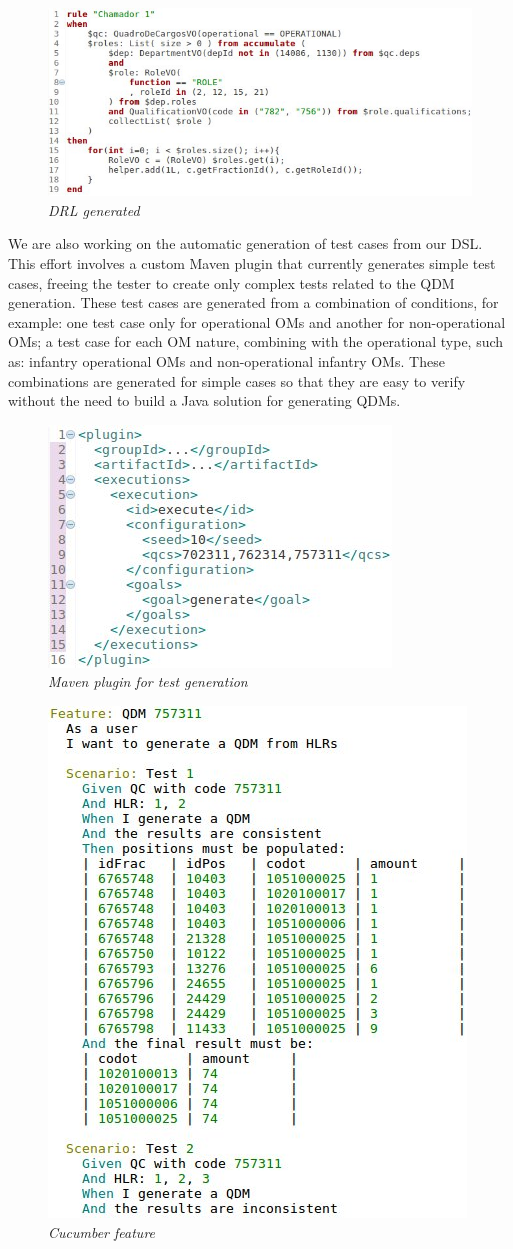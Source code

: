 \begin{figure}[!ht] \centering
	\includegraphics[width=.47\textwidth]{img/artigo_drl.jpg}
	\caption{\it DRL generated} 
	\label{fig:drl}
\end{figure}


We are also working on the automatic generation of test cases 
from our DSL. This effort involves a custom Maven plugin that currently generates simple test cases, 
freeing the tester to create only complex tests related to the QDM generation. 
These test cases are generated from a combination of conditions, for example: one test case only for operational OMs 
and another for non-operational OMs; a test case for each OM nature, combining with the operational type, 
such as: infantry operational OMs and non-operational infantry OMs. These combinations are generated for simple 
cases so that they are easy to verify without the need to build a Java solution for generating QDMs. 


\begin{figure}[!ht] \centering
  \includegraphics[width=.32\textwidth]
  {img/plugin.jpg}
  \caption{\it Maven plugin for test generation}
  \label{fig:pluginExample}
\end{figure}

\begin{figure}[!ht] \centering
  \includegraphics[width=.45\textwidth]
  {img/artigo_cucumber.jpg}
  \caption{\it Cucumber feature}
  \label{fig:cucumber}
\end{figure}

